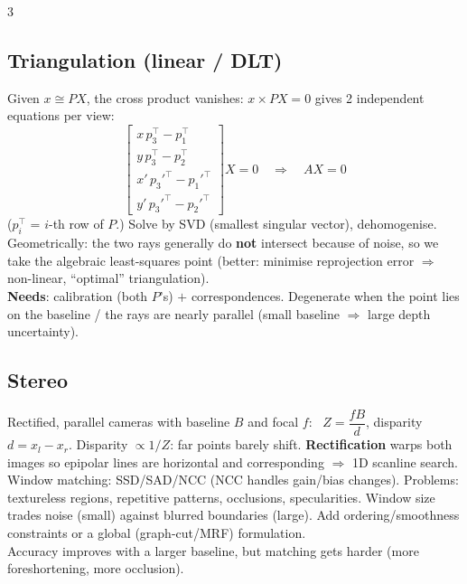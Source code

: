 \documentclass[9pt,a4paper,landscape]{extarticle}
\newcommand{\key}[1]{\textbf{#1}}
\begin{document}
\begin{multicols}{3}
\subsection{Triangulation (linear / DLT)}
Given $x\cong PX$, the cross product vanishes: $x\times PX=0$ gives 2 independent equations per view:
$$\begin{bmatrix}x\,p_3^\top-p_1^\top\\ y\,p_3^\top-p_2^\top\\ x'\,p_3'^\top-p_1'^\top\\ y'\,p_3'^\top-p_2'^\top\end{bmatrix}X=0 \quad\Rightarrow\quad AX=0$$
($p_i^\top$ = $i$-th row of $P$.) Solve by SVD (smallest singular vector), dehomogenise. Geometrically: the two rays generally do \key{not} intersect because of noise, so we take the algebraic least-squares point (better: minimise reprojection error $\Rightarrow$ non-linear, ``optimal'' triangulation).\\
\key{Needs}: calibration (both $P$'s) $+$ correspondences. Degenerate when the point lies on the baseline / the rays are nearly parallel (small baseline $\Rightarrow$ large depth uncertainty).

\subsection{Stereo}
Rectified, parallel cameras with baseline $B$ and focal $f$: \ \key{$Z=\dfrac{fB}{d}$}, disparity $d=x_l-x_r$. Disparity $\propto 1/Z$: far points barely shift. \key{Rectification} warps both images so epipolar lines are horizontal and corresponding $\Rightarrow$ 1D scanline search.\\
Window matching: SSD/SAD/NCC (NCC handles gain/bias changes). Problems: textureless regions, repetitive patterns, occlusions, specularities. Window size trades noise (small) against blurred boundaries (large). Add ordering/smoothness constraints or a global (graph-cut/MRF) formulation.\\
Accuracy improves with a larger baseline, but matching gets harder (more foreshortening, more occlusion).


\end{multicols}
\end{document}
